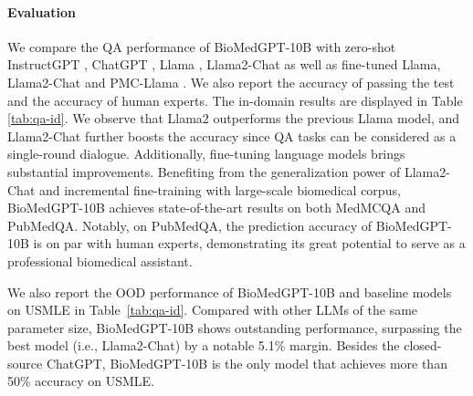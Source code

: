 \documentclass{article}
\begin{document}
\paragraph{Evaluation} 
We compare the QA performance of BioMedGPT-10B with zero-shot InstructGPT \citep{ouyang2022training}, ChatGPT \citep{chatgpt}, Llama \citep{touvron2023llama}, Llama2-Chat \citep{Touvron2023Llama2O} as well as fine-tuned Llama, Llama2-Chat and PMC-Llama \citep{pmc}. We also report the accuracy of passing the test and the accuracy of human experts. The in-domain results are displayed in Table \ref{tab:qa-id}. We observe that Llama2 outperforms the previous Llama model, and Llama2-Chat further boosts the accuracy since QA tasks can be considered as a single-round dialogue. Additionally, fine-tuning language models brings substantial improvements. Benefiting from the generalization power of Llama2-Chat and incremental fine-training with large-scale biomedical corpus, BioMedGPT-10B achieves state-of-the-art results on both MedMCQA and PubMedQA. Notably, on PubMedQA, the prediction accuracy of BioMedGPT-10B is on par with human experts, demonstrating its great potential to serve as a professional biomedical assistant.

We also report the OOD performance of BioMedGPT-10B and baseline models on USMLE in Table~\ref{tab:qa-id}. Compared with other LLMs of the same parameter size, BioMedGPT-10B shows outstanding performance, surpassing the best model (i.e., Llama2-Chat) by a notable 5.1\% margin. Besides the closed-source ChatGPT, BioMedGPT-10B is the only model that achieves more than 50\% accuracy on USMLE.
\end{document}
